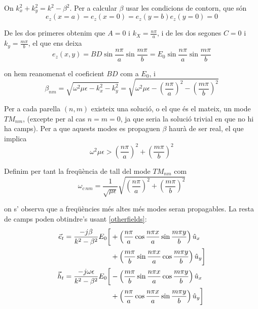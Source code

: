 On $k_x ^2 + k_y ^2 = k^2 - \beta ^2$. Per a calcular $\beta$ usar les condicions de contorn, que són
\begin{equation}
  e_z(x = a) = e_z (x = 0) = e_z(y = b) e_z(y = 0) = 0
\end{equation}

De les dos primeres obtenim que $A = 0$ i $k_X = \frac{n \pi}{a}$, i de les dos segones $C = 0$ i $k_y = \frac{m \pi}{b}$, el que ens deixa
\begin{equation}
  \label{solez}
  e_z (x, y) = BD \sin \frac{n \pi}{a} \sin \frac{m \pi }{b} = E_0  \sin \frac{n \pi}{a} \sin \frac{m \pi }{b}
\end{equation}

on hem reanomenat el coeficient $BD$ com a $E_0$, i
\begin{equation}
  \label{eq:solbeta}
  \beta_{nm} = \sqrt{ \omega ^2 \mu \epsilon - k_x ^2 - k_y ^ 2 } = \sqrt{\omega^2 \mu \epsilon - \left (\frac{n \pi}{a} \right ) ^2 - \left ( \frac{m \pi}{b} \right) ^2 }
\end{equation}

Per a cada parella $(n, m)$ existeix una solució, o el que és el mateix, un mode $TM_{nm}$, (excepte per al cas $n=m=0$, ja que seria la solució trivial en que no hi ha camps). Per a que aquests modes es propaguen $\beta $ haurà de ser real, el que implica
\begin{equation}
  \label{conds}
  \omega ^2 \mu \epsilon >  \left (\frac{n \pi}{a} \right ) ^2  + \left ( \frac{m \pi}{b} \right) ^2
\end{equation}

Definim per tant la freqüència de tall del mode $TM_{nm}$ com
\begin{equation}
  \omega _{c \,nm} =  \frac{1}{\sqrt{\mu \epsilon}} \sqrt{   \left (\frac{n \pi}{a} \right ) ^2 + \left ( \frac{m \pi}{b} \right) ^2}
\end{equation}

on s' observa que a freqüències més altes més modes seran propagables. La resta de camps poden obtindre's usant \cref{otherfields}:
\begin{subequations}
\begin{align}
  \vec e_t = \frac{ - j \beta }{k^ 2 - \beta ^ 2} E_0
  \bigg [
    &+\left (\frac{n \pi}{a} \cos \frac{n \pi x}{a} \sin \frac{m \pi y}{b} \right ) \hat u_x \nonumber \\
    &+\left (\frac{m \pi}{b} \sin \frac{n \pi x}{a} \cos \frac{m \pi y}{b} \right )\hat u_y
  \bigg ] \\
  \vec h _ t = \frac{  -j \omega \epsilon }{k^ 2 - \beta ^ 2} E_0
  \bigg [
    &-\left (\frac{m \pi}{b} \sin \frac{n \pi x}{a} \cos \frac{m \pi y}{b} \right ) \hat u_x \nonumber \\
    &+\left (\frac{n \pi}{a} \cos \frac{n \pi x}{a} \sin \frac{m \pi y}{b} \right ) \hat u_y
  \bigg ]
\end{align}
\label{rectTM}
\end{subequations}


